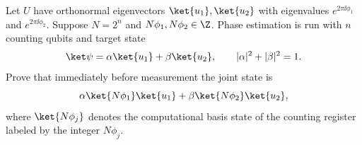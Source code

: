 Let $U$ have orthonormal eigenvectors $\ket{u_1},\ket{u_2}$ with eigenvalues $e^{2\pi\ii\phi_1}$ and $e^{2\pi\ii\phi_2}$.  Suppose $N=2^n$ and $N\phi_1,N\phi_2\in\Z$.  Phase estimation is run with $n$ counting qubits and target state
$$
    \ket\psi=\alpha\ket{u_1}+\beta\ket{u_2},
    \qquad |\alpha|^2+|\beta|^2=1.
$$
Prove that immediately before measurement the joint state is
$$
    \alpha\ket{N\phi_1}\ket{u_1}+\beta\ket{N\phi_2}\ket{u_2},
$$
where $\ket{N\phi_j}$ denotes the computational basis state of the counting register labeled by the integer $N\phi_j$.
